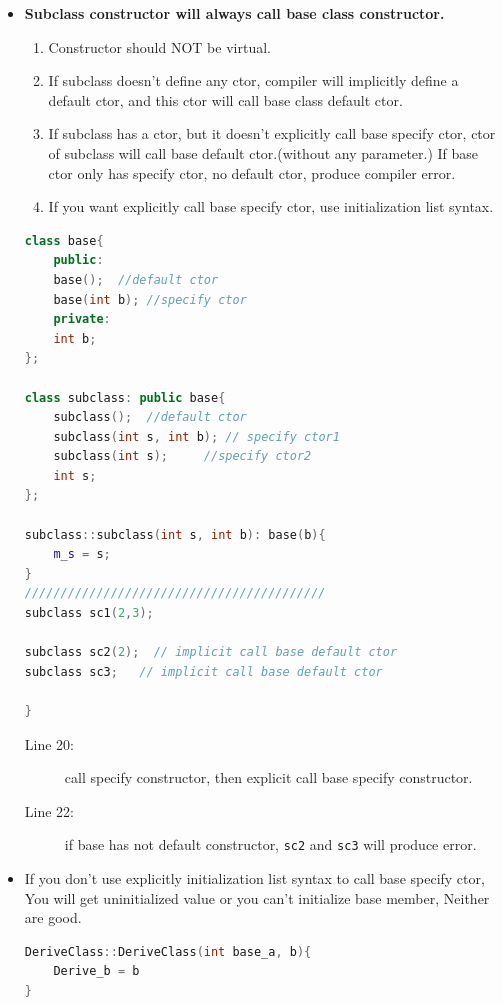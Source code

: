 \documentclass[a4paper,11pt,twoside]{book}
\begin{document}
\begin{itemize}
	\item  \textbf{Subclass constructor will always call base class constructor.}
	
	\begin{enumerate}
		\item Constructor should NOT be virtual.
		
		\item If subclass doesn't define any ctor, compiler will implicitly define a default ctor, and this ctor will call base class default ctor.
		
		\item If subclass has a ctor, but it doesn't explicitly call base specify ctor, ctor of subclass will call base default ctor.(without any parameter.) If base ctor only has specify ctor, no default ctor, produce compiler error.
		
		\item If you want explicitly call base specify ctor, use initialization list syntax.
	\end{enumerate}
	
\begin{lstlisting}[frame=single, language=c++]
class base{
	public:
	base();  //default ctor
	base(int b); //specify ctor
	private:
	int b;
};
	
class subclass: public base{
	subclass();  //default ctor
	subclass(int s, int b); // specify ctor1
	subclass(int s);     //specify ctor2
	int s;
};
	
subclass::subclass(int s, int b): base(b){
	m_s = s;
}
//////////////////////////////////////////
subclass sc1(2,3);

subclass sc2(2);  // implicit call base default ctor
subclass sc3;   // implicit call base default ctor

}
\end{lstlisting}
\begin{description}
	\item[Line 20:] call specify constructor, then explicit call base specify constructor.
	\item[Line 22:] if base has not default constructor, \texttt{sc2} and \texttt{sc3} will produce error.
\end{description}
	\item If you don't use  explicitly initialization list syntax to call base specify ctor, You will get uninitialized value or you can't initialize base member, Neither are good.
\begin{lstlisting}[frame=single, language=c++]
DeriveClass::DeriveClass(int base_a, b){
	Derive_b = b
}	


\end{lstlisting}
\end{itemize}
\end{document}

